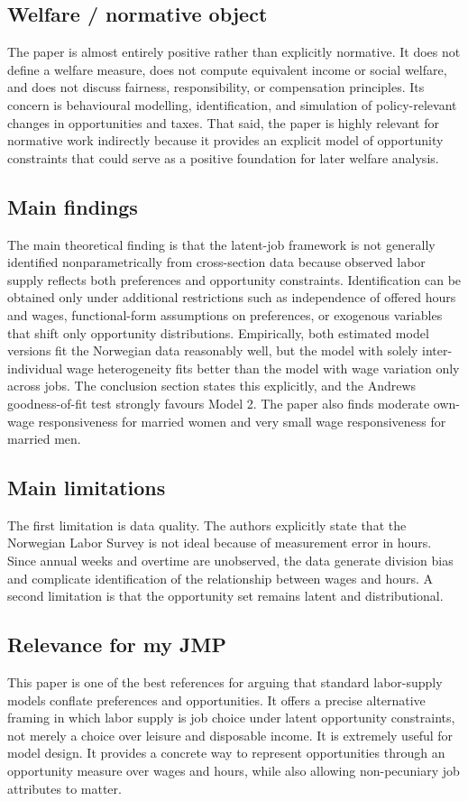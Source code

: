 \documentclass[11pt,a4paper]{article}
\begin{document}
\subsection*{Welfare / normative object}
The paper is almost entirely positive rather than explicitly normative. It does not define a welfare measure, does not compute equivalent income or social welfare, and does not discuss fairness, responsibility, or compensation principles. Its concern is behavioural modelling, identification, and simulation of policy-relevant changes in opportunities and taxes. That said, the paper is highly relevant for normative work indirectly because it provides an explicit model of opportunity constraints that could serve as a positive foundation for later welfare analysis.

\subsection*{Main findings}
The main theoretical finding is that the latent-job framework is not generally identified nonparametrically from cross-section data because observed labor supply reflects both preferences and opportunity constraints. Identification can be obtained only under additional restrictions such as independence of offered hours and wages, functional-form assumptions on preferences, or exogenous variables that shift only opportunity distributions. Empirically, both estimated model versions fit the Norwegian data reasonably well, but the model with solely inter-individual wage heterogeneity fits better than the model with wage variation only across jobs. The conclusion section states this explicitly, and the Andrews goodness-of-fit test strongly favours Model 2. The paper also finds moderate own-wage responsiveness for married women and very small wage responsiveness for married men.

\subsection*{Main limitations}
The first limitation is data quality. The authors explicitly state that the Norwegian Labor Survey is not ideal because of measurement error in hours. Since annual weeks and overtime are unobserved, the data generate division bias and complicate identification of the relationship between wages and hours. A second limitation is that the opportunity set remains latent and distributional.

\subsection*{Relevance for my JMP}
This paper is one of the best references for arguing that standard labor-supply models conflate preferences and opportunities. It offers a precise alternative framing in which labor supply is job choice under latent opportunity constraints, not merely a choice over leisure and disposable income. It is extremely useful for model design. It provides a concrete way to represent opportunities through an opportunity measure over wages and hours, while also allowing non-pecuniary job attributes to matter.
\end{document}
